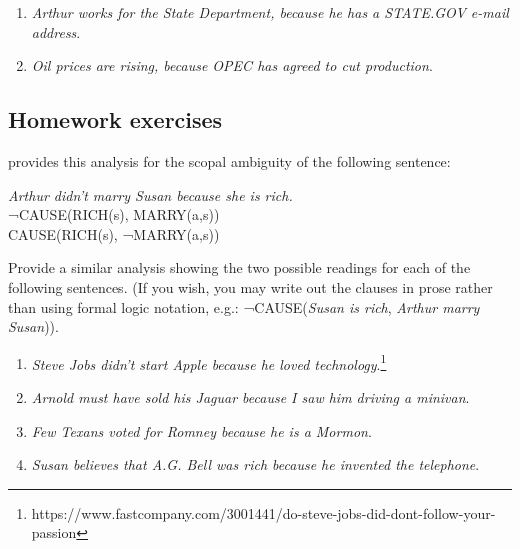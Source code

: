 \begin{enumerate}
\item 
\textit{Arthur works for the State Department, because he has a STATE.GOV e-mail address}.
\item 
\textit{Oil prices are rising, because OPEC has agreed to cut production}.
\end{enumerate}
\subsection*{Homework exercises}

 provides this analysis for the scopal ambiguity of the following sentence:

\ea
  \textit{Arthur didn’t marry Susan because she is rich.}\\
\ea ¬CAUSE(RICH(s), MARRY(a,s))\\
\ex CAUSE(RICH(s), ¬MARRY(a,s))
\z \z

Provide a similar analysis showing the two possible readings for each of the following sentences. (If you wish, you may write out the clauses in prose rather than using formal logic notation, e.g.: ¬CAUSE(\textit{Susan is rich}, \textit{Arthur marry Susan})).

\begin{enumerate}
\item \textit{Steve Jobs didn’t start Apple because he loved technology}.\footnote{https://www.fastcompany.com/3001441/do-steve-jobs-did-dont-follow-your-passion}
\item \textit{Arnold must have sold his Jaguar because I saw him driving a minivan}.
\item \textit{Few Texans voted for Romney because he is a Mormon}.
\item \textit{Susan believes that A.G. Bell was rich because he invented the telephone}.
\end{enumerate}

